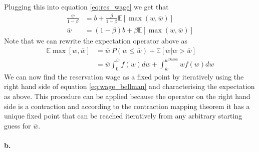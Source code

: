 Plugging this into equation \eqref{eq:res_wage} we get that
\begin{align}
\label{eq:wage_bellman}
  \frac{\bar{w}}{1 - \beta} &= b + \frac{\beta}{1 - \beta} \mathbb{E} [\max(w,
                              \bar{w})] \nonumber\\
                    \bar{w} &= (1 - \beta) b + \beta \mathbb{E} [\max (w, \bar{w})]
\end{align}
Note that we can rewrite the expectation operator above as
\begin{align*}
  \mathbb{E} \max[w, \bar{w}] &= \bar{w}~P(w \leq \bar{w}) + \mathbb{E} [w | w >
                                \bar{w}] \\
                              &= \bar{w} \int_0^{\bar{w}} f(w) dw + \int_{\bar{w}}^{w^{\text{Daron}}} w f(w) dw
\end{align*}
We can now find the reservation wage as a fixed point by iteratively using the
right hand side of equation \eqref{eq:wage_bellman} and characterising the
expectation as above. This procedure can be applied because the operator on the
right hand side is a contraction and according to the contraction mapping
theorem it has a unique fixed point that can be reached iteratively from any
arbitrary starting guess for $\bar{w}$.

\paragraph{b.}

